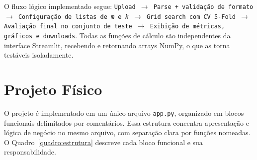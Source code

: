 \documentclass[12pt,a4paper]{article}
\begin{document}
O fluxo lógico implementado segue: \texttt{Upload $\rightarrow$ Parse + validação de formato $\rightarrow$ Configuração de listas de \textit{m} e \textit{k} $\rightarrow$ Grid search com CV 5-Fold $\rightarrow$ Avaliação final no conjunto de teste $\rightarrow$ Exibição de métricas, gráficos e downloads}. Todas as funções de cálculo são independentes da interface Streamlit, recebendo e retornando arrays NumPy, o que as torna testáveis isoladamente.

\newpage
\section{Projeto Físico}

O projeto é implementado em um único arquivo \texttt{app.py}, organizado em blocos funcionais delimitados por comentários. Essa estrutura concentra apresentação e lógica de negócio no mesmo arquivo, com separação clara por funções nomeadas. O Quadro~\ref{quadro:estrutura} descreve cada bloco funcional e sua responsabilidade.
\end{document}
